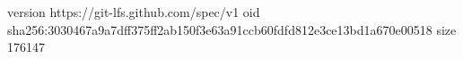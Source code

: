 version https://git-lfs.github.com/spec/v1
oid sha256:3030467a9a7dff375ff2ab150f3e63a91ccb60fdfd812e3ce13bd1a670e00518
size 176147
